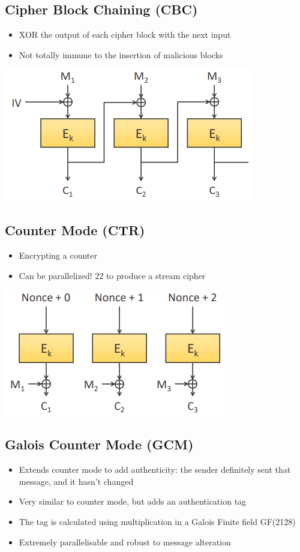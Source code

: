 \documentclass{article}
\begin{document}
\subsection{Cipher Block Chaining (CBC)}
\begin{itemize}
  \item XOR the output of each cipher block with the next input 
  \item Not totally immune to the insertion of malicious blocks
\end{itemize}
\begin{center}
  \includegraphics[scale=0.5]{cbc.png}
\end{center}

\subsection{Counter Mode (CTR)}
\begin{itemize}
  \item Encrypting a counter 
  \item Can be parallelized! 22 to produce a stream cipher
\end{itemize}
\begin{center}
  \includegraphics[scale=0.5]{ctr.png}
\end{center}

\subsection{Galois Counter Mode (GCM)}
\begin{itemize}
  \item Extends counter mode to add authenticity: the sender definitely sent that message, and it hasn’t changed 
  \item Very similar to counter mode, but adds an authentication tag 
  \item The tag is calculated using multiplication in a Galois Finite field GF(2128) 
  \item Extremely parallelisable and robust to message alteration
\end{itemize}
\end{document}
